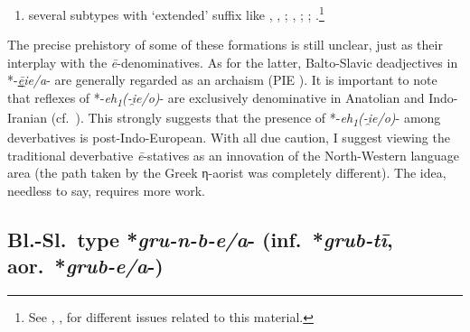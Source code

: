 \documentclass[output=paper,colorlinks,citecolor=brown]{langscibook}
\begin{document}
\begin{enumerate}
\begin{enumerate}
        \item several subtypes with ‘extended’ suffix like , , ; , ; ; .\footnote{See \citet[11--32]{Ostrowski2006}, \citet{Serzant2014}, \citet[100--114]{RothsteinDowden2022} for different issues related to this material.}
        \end{enumerate}
\end{enumerate}

The precise prehistory of some of these formations is still unclear, just as their interplay with the \textit{ē}-denominatives. As for the latter, Balto-Slavic deadjectives in *-\textit{\underline{ē}i̯e/a}- are generally regarded as an archaism (PIE ). It is important to note that reflexes of *-\textit{eh\textsubscript{1}(-i̯e/o)}- are exclusively denominative in Anatolian and Indo-Iranian (cf.\ \citealt{Yakubovich2014}). This strongly suggests that the presence of *-\textit{eh\textsubscript{1}(-i̯e/o)}- among deverbatives is post-Indo-European. With all due caution, I suggest viewing the traditional deverbative \textit{ē}-statives as an innovation of the North-Western language area (the path taken by the Greek η-aorist was completely different). The idea, needless to say, requires more work.

\subsection{Bl.-Sl.\ type *\textit{gru-n-b-e/a}- (inf.\ *\textit{grub-tī}, aor.\ *\textit{grub-e/a}-)}
\label{sec:BSlgrun}
\end{document}
